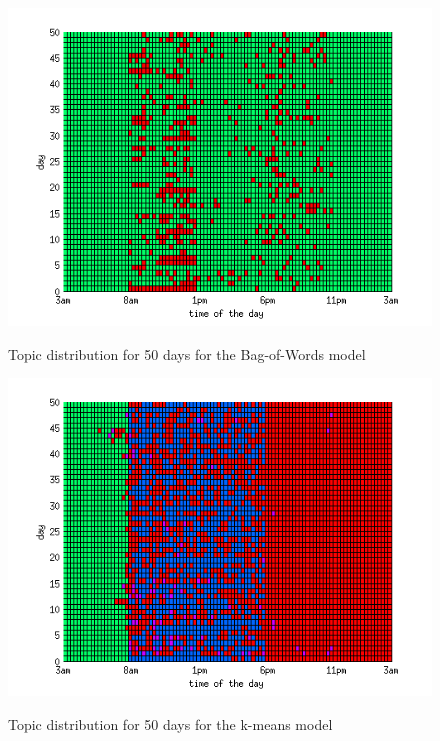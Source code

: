 \begin{figure}[h!]
 \centering
 \begin{minipage}[b]{0.45\linewidth}
  \centering
  \includegraphics[width=\textwidth]{Pictures/DayTopicsTs96k5bow.png}
  \caption{Topic distribution for 50 days for the Bag-of-Words model}
  \label{fig:bow96}
 \end{minipage}
 \begin{minipage}[b]{0.45\linewidth}
  \centering
  \includegraphics[width=\textwidth]{Pictures/DayTopicsTs96k5Clus.png}
  \caption{Topic distribution for 50 days for the k-means model}
  \label{fig:kMeans96}
 \end{minipage}
 \caption{}
\end{figure}



